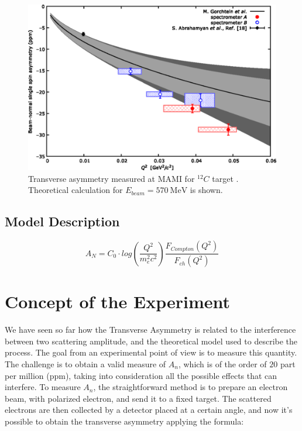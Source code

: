 \begin{figure}[hbtp]
\centering
\includegraphics[scale = 0.5]{Transverse/medium.png}
\caption{Transverse asymmetry measured at MAMI for $^{12}C$ target \cite{Esser:2018vdp}. Theoretical calculation for $E_{beam} = \SI{570}{\mega \electronvolt}$  is shown.}
\end{figure}

  

\subsection{Model Description}
\medskip

\begin{equation}
A_{N} = C_{0} \cdot log(\dfrac{Q^{2}}{m_{e}^{2} c^{2}}) \dfrac{F_{Compton}(Q^{2})}{F_{ch}(Q^{2})}
\end{equation}

\section{Concept of the Experiment}

We have seen so far how the Transverse Asymmetry is related to the interference between two scattering amplitude, and the theoretical model used to describe the process. The goal from an experimental point of view is to measure this quantity. The challenge is to obtain a valid measure of $A_{n}$, which is of the order of $20$ part per million (ppm), taking into consideration all the possible effects that can interfere. To measure $A_{n}$, the straightforward method is to prepare an electron beam, with polarized electron, and send it to a fixed target. The scattered electrons are then collected by a detector placed at a certain angle, and now it's possible to obtain the transverse asymmetry applying the formula:

